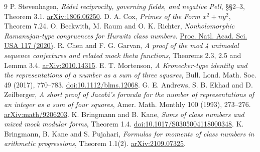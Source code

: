 \documentclass[11pt]{article}
\begin{document}
\begin{thebibliography}{9}
 P. Stevenhagen, \emph{R\'edei reciprocity, governing
fields, and negative Pell}, \S\S2--3, Theorem 3.1.
\href{https://arxiv.org/abs/1806.06250}{arXiv:1806.06250}.
 D. A. Cox, \emph{Primes of the Form $x^2+ny^2$},
Theorem 7.24.
 O. Beckwith, M. Raum and O. K. Richter,
\emph{Nonholomorphic Ramanujan-type congruences for Hurwitz class numbers}.
\href{https://doi.org/10.1073/pnas.2005984117}{Proc. Natl. Acad. Sci. USA 117 (2020)}.
 R. Chen and F. G. Garvan, \emph{A proof of the mod 4
unimodal sequence conjectures and related mock theta functions},
Theorems 2.3, 2.5 and Lemma 3.4.
\href{https://arxiv.org/abs/2010.14315}{arXiv:2010.14315}.
 E. T. Mortenson, \emph{A Kronecker-type identity
and the representations of a number as a sum of three squares},
Bull. Lond. Math. Soc. 49 (2017), 770--783.
\href{https://doi.org/10.1112/blms.12068}{doi:10.1112/blms.12068}.
 G. E. Andrews, S. B. Ekhad and D. Zeilberger,
\emph{A short proof of Jacobi's formula for the number of
representations of an integer as a sum of four squares},
Amer. Math. Monthly 100 (1993), 273--276.
\href{https://arxiv.org/abs/math/9206203}{arXiv:math/9206203}.
 K. Bringmann and B. Kane, \emph{Sums of class numbers
and mixed mock modular forms}, Theorem 1.4.
\href{https://doi.org/10.1017/S0305004118000348}{doi:10.1017/S0305004118000348}.
 K. Bringmann, B. Kane and S. Pujahari,
\emph{Formulas for moments of class numbers in arithmetic
progressions}, Theorem 1.1(2).
\href{https://arxiv.org/abs/2109.07325}{arXiv:2109.07325}.
\end{thebibliography}
\end{document}
